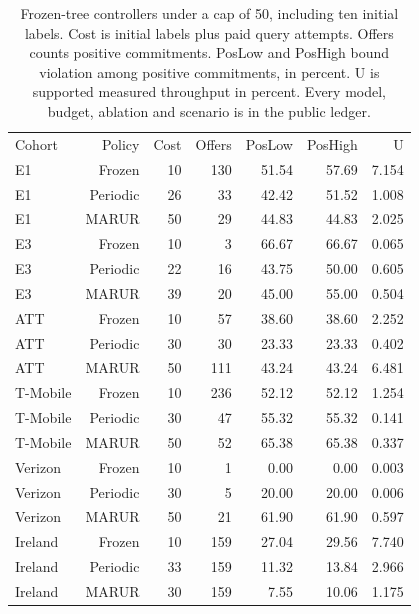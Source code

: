 \begin{table}[!ht]
\centering\small
\caption{Frozen-tree controllers under a cap of 50, including ten initial labels. Cost is initial labels plus paid query attempts. Offers counts positive commitments. PosLow and PosHigh bound violation among positive commitments, in percent. U is supported measured throughput in percent. Every model, budget, ablation and scenario is in the public ledger.}
\begin{tabular}{lrrrrrr}
\hline
Cohort & Policy & Cost & Offers & PosLow & PosHigh & U \\
E1 & Frozen & 10 & 130 & 51.54 & 57.69 & 7.154 \\
E1 & Periodic & 26 & 33 & 42.42 & 51.52 & 1.008 \\
E1 & MARUR & 50 & 29 & 44.83 & 44.83 & 2.025 \\
E3 & Frozen & 10 & 3 & 66.67 & 66.67 & 0.065 \\
E3 & Periodic & 22 & 16 & 43.75 & 50.00 & 0.605 \\
E3 & MARUR & 39 & 20 & 45.00 & 55.00 & 0.504 \\
ATT & Frozen & 10 & 57 & 38.60 & 38.60 & 2.252 \\
ATT & Periodic & 30 & 30 & 23.33 & 23.33 & 0.402 \\
ATT & MARUR & 50 & 111 & 43.24 & 43.24 & 6.481 \\
T-Mobile & Frozen & 10 & 236 & 52.12 & 52.12 & 1.254 \\
T-Mobile & Periodic & 30 & 47 & 55.32 & 55.32 & 0.141 \\
T-Mobile & MARUR & 50 & 52 & 65.38 & 65.38 & 0.337 \\
Verizon & Frozen & 10 & 1 & 0.00 & 0.00 & 0.003 \\
Verizon & Periodic & 30 & 5 & 20.00 & 20.00 & 0.006 \\
Verizon & MARUR & 50 & 21 & 61.90 & 61.90 & 0.597 \\
Ireland & Frozen & 10 & 159 & 27.04 & 29.56 & 7.740 \\
Ireland & Periodic & 33 & 159 & 11.32 & 13.84 & 2.966 \\
Ireland & MARUR & 30 & 159 & 7.55 & 10.06 & 1.175 \\
\hline
\end{tabular}
\end{table}
